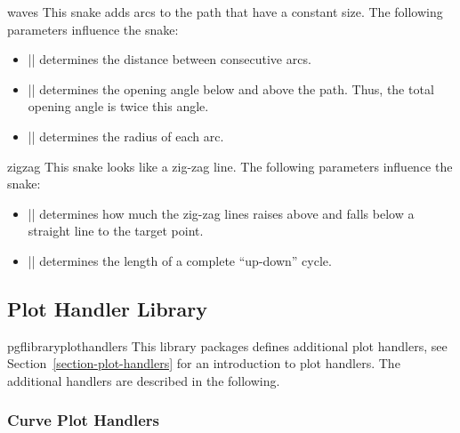 \begin{snake}{waves}
  This snake adds arcs to the path that have a constant size. The
  following parameters influence the snake: 
  \begin{itemize}
  \item |\pgfsnakesegmentlength|
    determines the distance between consecutive arcs.
  \item |\pgfsnakesegmentangle|
    determines the opening angle below and above the path. Thus, the
    total opening angle is twice this angle.
  \item |\pgfsnakesegmentamplitude|
    determines the radius of each arc.
  \end{itemize}
\begin{codeexample}[]
\end{codeexample}
\end{snake}


\begin{snake}{zigzag}
  This snake looks like a zig-zag line. The following parameters
  influence the snake:
  \begin{itemize}
  \item |\pgfsnakesegmentamplitude|
    determines how much the zig-zag lines raises above and falls below
    a straight line to the target point.
  \item |\pgfsnakesegmentlength|
    determines the length of a complete ``up-down'' cycle.
  \end{itemize}
\begin{codeexample}[]
\end{codeexample}
\end{snake}



\subsection{Plot Handler Library}
\label{section-library-plothandlers}

\begin{package}{pgflibraryplothandlers}
  This library packages defines additional plot handlers, see
  Section~\ref{section-plot-handlers} for an introduction to plot
  handlers. The additional handlers are described in the following. 
\end{package}


\subsubsection{Curve Plot Handlers}
  
